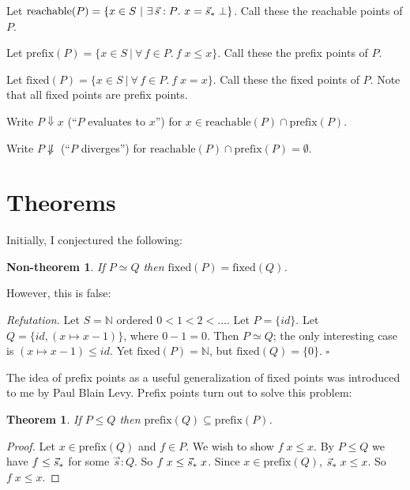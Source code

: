 \documentclass{article}
\newcommand{\fa}[1]{\forall\,{#1}.\ }
\newcommand{\te}[1]{\exists\,{#1}.\ }
\newcommand{\N}{\mathbb{N}}
\newcommand{\setof}[2]{\{{#1}~|~{#2}\}}
\newcommand{\todo}[1]{{\color{red}{#1}}}
\newtheorem{theorem}{Theorem}
\newtheorem{nontheorem}{Non-theorem}
\newenvironment{refutation}
  {\vspace{0.5em}\noindent\textit{Refutation.}}
  {\hfill$\square$\vspace{0.5em}}
\begin{document}
\todo{Could I instead (or additionally) consider sets closed under composition
  and identity? Hm...}

\newcommand{\prefix}[1]{\ensuremath{\text{prefix}(#1)}}
\newcommand{\fixed}[1]{\ensuremath{\text{fixed}(#1)}}
\newcommand{\reach}[1]{\ensuremath{\text{reachable}(#1)}}

Let $\reach{P} = \setof{x \in S}{\te{\vec{s} : P} x = \seq{s}\; \bot}$. Call
these the reachable points of $P$.

Let $\prefix{P} = \setof{x \in S}{\fa{f \in P} f\; x \le x}$. Call these the prefix points of $P$.

Let $\fixed{P} = \setof{x \in S}{\fa{f \in P} f\;x = x}$. Call these the fixed
points of $P$. Note that all fixed points are prefix points.

\newcommand{\eval}{\Downarrow}
\newcommand{\diverge}{\not\eval}

Write $P \eval x$ (``$P$ evaluates to $x$'') for $x \in \reach{P} \cap
\prefix{P}$.

Write $P \diverge$ (``$P$ diverges'') for $\reach{P} \cap \prefix{P} = \emptyset$.


\section{Theorems}

Initially, I conjectured the following:

\begin{nontheorem}
  If $P \simeq Q$ then $\fixed{P} = \fixed{Q}$.
\end{nontheorem}

However, this is false:

\begin{refutation}
  Let $S = \N$ ordered $0 < 1 < 2 < ...$. Let $P = \{id\}$. Let $Q = \{id, (x
  \mapsto x - 1)\}$, where $0 - 1 = 0$. Then $P \simeq Q$; the only interesting
  case is $(x \mapsto x - 1) \le id$. Yet $\fixed{P} = \N$, but $\fixed{Q} =
  \{0\}$.
\end{refutation}

The idea of prefix points as a useful generalization of fixed points was
introduced to me by Paul Blain Levy. Prefix points turn out to solve this
problem:

\begin{theorem}
  If $P \le Q$ then $\prefix{Q} \subseteq \prefix{P}$.
  \label{thm:prefix-antitone}
\end{theorem}

\begin{proof}
  Let $x \in \prefix{Q}$ and $f \in P$. We wish to show $f\;x \le x$. By $P \le
  Q$ we have $f \le {\vec{s}_*}$ for some $\vec{s} : Q$. So $f\;x \le {\vec{s}_*}\;x$.
  Since $x \in \prefix{Q}$, ${\vec{s}_*}\;x \le x$. So $f\; x \le x$.
\end{proof}
\end{document}
